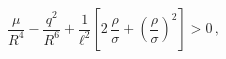 \begin{equation}\frac{\mu}{R^4}-\frac{q^2}{R^6}+\frac{1}{\ell^2}
\left[2\,\frac{\rho}{\sigma}+\left(\frac{\rho}{\sigma}\right)^2\right]>0\,,
\end{equation}

